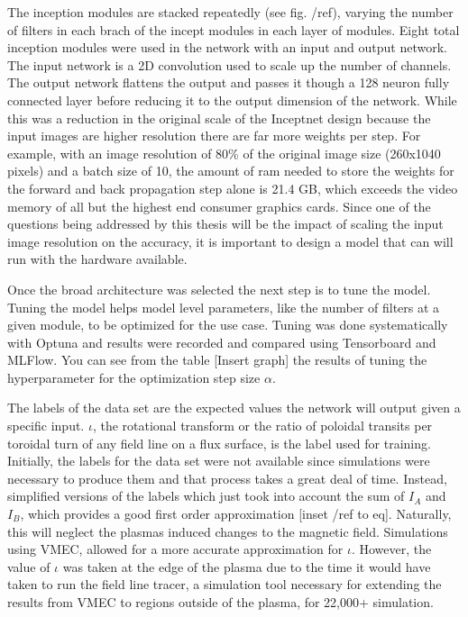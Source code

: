 The inception modules are stacked repeatedly (see fig. /ref{}), varying the number of filters in each brach of the incept modules in each layer of modules.
Eight total inception modules were used in the network with an input and output network.
The input network is a 2D convolution used to scale up the number of channels.
The output network flattens the output and passes it though a 128 neuron fully connected layer before reducing it to the output dimension of the network.
While this was a reduction in the original scale of the Inceptnet design because the input images are higher resolution there are far more weights per step.
For example, with an image resolution of 80\% of the original image size (260x1040 pixels) and a batch size of 10, the amount of ram needed to store the weights for the forward and back propagation step alone is 21.4 GB, which exceeds the video memory of all but the highest end consumer graphics cards.
Since one of the questions being addressed by this thesis will be the impact of scaling the input image resolution on the accuracy, it is important to design a model that can will run with the hardware available.

\label{sec:code:hyperparameters}

Once the broad architecture was selected the next step is to tune the model.
Tuning the model helps model level parameters, like the number of filters at a given module, to be optimized for the use case.
Tuning was done systematically with Optuna and results were recorded and compared using Tensorboard and MLFlow.
You can see from the table [Insert graph] the results of tuning the hyperparameter for the optimization step size $\alpha$.


The labels of the data set are the expected values the network will output given a specific input.
$\iota$, the rotational transform or the ratio of poloidal transits per toroidal turn of any field line on a flux surface, is the label used for training.
Initially, the labels for the data set were not available since simulations were necessary to produce them and that process takes a great deal of time.
Instead, simplified versions of the labels which just took into account the sum of $I_A$ and $I_B$, which provides a good first order approximation [inset /ref{} to eq].
Naturally, this will neglect the plasmas induced changes to the magnetic field.
Simulations using VMEC,  allowed for a more accurate approximation for $\iota$.
However, the value of $\iota$ was taken at the edge of the plasma due to the time it would have taken to run the field line tracer, a simulation tool necessary for extending the results from VMEC to regions outside of the plasma, for 22,000+ simulation.



